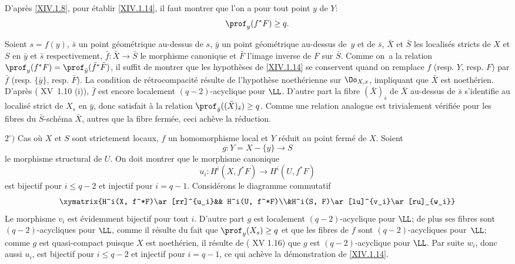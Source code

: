 D'apr\`es \ref{XIV.1.8}, pour \'etablir \ref{XIV.1.14}, il faut montrer que l'on a pour tout point $y$ de $Y$:$$
\prof_y(f^*F)\geq q.
$$

Soient $s=f(y)$, $\bar s$ un point g\'eom\'etrique au-dessus de $s$, $\bar y$ un point g\'eom\'etrique au-dessus de~$y$ et de $\bar s$, $\bar X$ et $\bar S$ les localis\'es stricts de $X$ et $S$ en $\bar y$ et $\bar s$ respectivement, $\bar f:\bar X\to\bar S$ le morphisme canonique et $\bar F$ l'image inverse de $F$ sur $\bar S$. Comme on~a la relation $\prof_y(f^*F)=\prof_{\bar y}(\bar f^*\bar F)$, il suffit de montrer que les hypoth\`eses de \ref{XIV.1.14} se conservent quand on remplace $f$ (resp. $Y$, resp. $F$) par $\bar f$ (resp. $\{\bar y\}$, resp. $\bar F$). La condition de r\'etrocompacit\'e r\'esulte de l'hypoth\`ese noeth\'erienne sur $\Oo_{X, x}$, impliquant que $\bar X$ est noeth\'erien. D'apr\`es ( XV~1.10 \textup{(i)}), $\bar f$ est encore localement $(q-2)$-acyclique pour $\LL$. D'autre part la fibre $(\bar X)_{\bar s}$ de $\bar X$ au-dessus de $\bar s$ s'identifie au localis\'e strict de $X_s$ en $\bar y$, donc satisfait \`a la relation $\prof_{\bar y}((\bar X)_{\bar s})\geq q$. Comme une relation analogue est trivialement v\'erifi\'ee pour les fibres du $\bar S$-sch\'ema $\bar X$, autres que la fibre ferm\'ee, ceci ach\`eve la r\'eduction.

$2^\circ)$ Cas o\`u $X$ et $S$ sont strictement locaux, $f$ un homomorphisme local et $Y$ r\'eduit au point ferm\'e de $X$. Soient
$$g:Y=X-\{y\}\to S$$
le morphisme structural de $U$. On doit montrer que le morphisme canonique
$$u_i:H^i(X, f^*F)\to H^i(U, f^*F)$$
est bijectif pour $i\leq q-2$ et injectif pour $i=q-1$. Consid\'erons le diagramme commutatif
$$
\xymatrix{H^i(X, f^*F)\ar[rr]^{u_i}&& H^i(U, f^*F)\\&H^i(S, F)\ar[lu]^{v_i}\ar[ru]_{w_i}}$$
Le morphisme $v_i$ est \'evidemment bijectif pour tout $i$. D'autre part $g$ est localement $(q-2)$-acyclique pour $\LL$; de plus ses fibres sont $(q-2)$-acycliques pour $\LL$, comme il r\'esulte du fait que $\prof_y(X_s)\geq q$ et que les fibres de $f$ sont $(q-2)$-acycliques pour~$\LL$; comme $g$ est quasi-compact puisque $X$ est noeth\'erien, il r\'esulte de ( XV 1.16) que $g$ est $(q-2)$-acyclique pour $\LL$. Par suite $w_i$, donc aussi $u_i$, est bijectif pour $i\leq q-2$ et injectif pour $i=q-1$, ce qui ach\`eve la d\'emonstration de \ref{XIV.1.14}.

